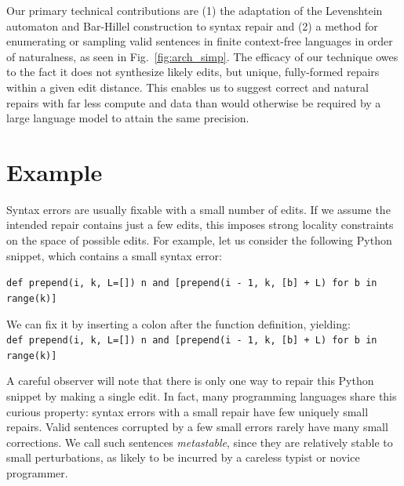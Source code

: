 \documentclass[sigplan,review,acmsmall,nonacm,anonymous]{acmart}\settopmatter{printfolios=false,printccs=false,printacmref=false}
\begin{document}
  Our primary technical contributions are (1) the adaptation of the Levenshtein automaton and Bar-Hillel construction to syntax repair and (2) a method for enumerating or sampling valid sentences in finite context-free languages in order of naturalness, as seen in Fig.~\ref{fig:arch_simp}. The efficacy of our technique owes to the fact it does not synthesize likely edits, but unique, fully-formed repairs within a given edit distance. This enables us to suggest correct and natural repairs with far less compute and data than would otherwise be required by a large language model to attain the same precision.

  \section{Example}\label{sec:example}

  Syntax errors are usually fixable with a small number of edits. If we assume the intended repair contains just a few edits, this imposes strong locality constraints on the space of possible edits. For example, let us consider the following Python snippet, which contains a small syntax error:\vspace{0.3cm}

  \texttt{def prepend(i, k, L=[]) n and [prepend(i - 1, k, [b] + L) for b in range(k)]}\vspace{0.3cm}

  We can fix it by inserting a colon after the function definition, yielding:\\

  \texttt{def prepend(i, k, L=[])\hlgreen{:} n and [prepend(i - 1, k, [b] + L) for b in range(k)]} \vspace{0.3cm}

  A careful observer will note that there is only one way to repair this Python snippet by making a single edit. In fact, many programming languages share this curious property: syntax errors with a small repair have few uniquely small repairs. Valid sentences corrupted by a few small errors rarely have many small corrections. We call such sentences \textit{metastable}, since they are relatively stable to small perturbations, as likely to be incurred by a careless typist or novice programmer.
%
%
%
\end{document}
